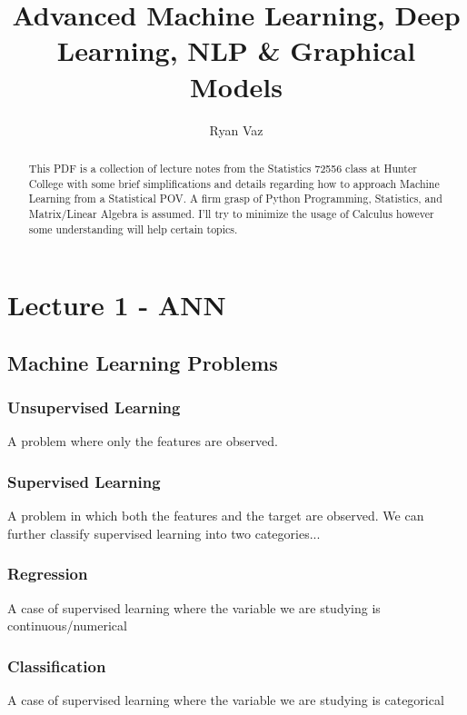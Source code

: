 \documentclass[article]{llncs}
\begin{document}
%
\graphicspath{ {./images/} }
\title{Advanced Machine Learning, Deep Learning, NLP \& Graphical Models}
%
%
\author{Ryan Vaz}
%
%
\maketitle 
%
\begin{abstract}
This PDF is a collection of lecture notes from the Statistics 72556 class at Hunter College with some brief simplifications and details regarding how to approach Machine Learning from a Statistical POV. A firm grasp of Python Programming, Statistics, and Matrix/Linear Algebra is assumed. I'll try to minimize the usage of Calculus however some understanding will help certain topics.
\end{abstract}
%
\begingroup
\let\clearpage\relax
\tableofcontents*
\endgroup
%
\section{Lecture 1 - ANN}
\subsection{Machine Learning Problems}

\subsubsection{Unsupervised Learning} A problem where only the features are observed.

\subsubsection{Supervised Learning} A problem in which both the features and the target are observed. We can further classify supervised learning into two categories...

\subsubsection{Regression} A case of supervised learning where the variable we are studying is continuous/numerical

\subsubsection{Classification} A case of supervised learning where the variable we are studying is categorical
\end{document}

